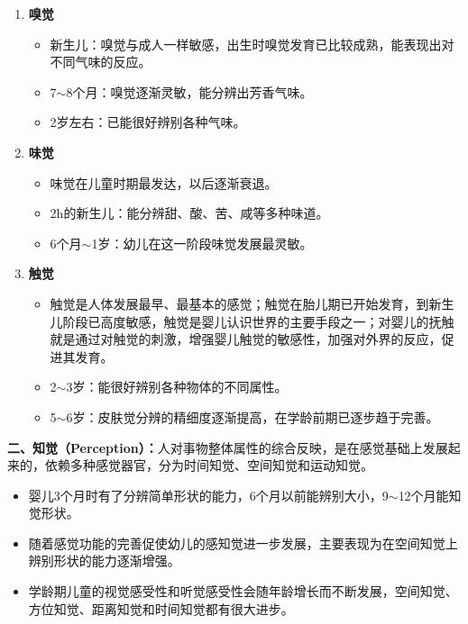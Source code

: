 \begin{keybox}
\begin{enumerate}[leftmargin=*]
    \item \textbf{嗅觉}
    \begin{itemize}[leftmargin=*]
        \item 新生儿：嗅觉与成人一样敏感，出生时嗅觉发育已比较成熟，能表现出对不同气味的反应。
        \item 7$\sim$8个月：嗅觉逐渐灵敏，能分辨出芳香气味。
        \item 2岁左右：已能很好辨别各种气味。
    \end{itemize}

    \item \textbf{味觉}
    \begin{itemize}[leftmargin=*]
        \item 味觉在儿童时期最发达，以后逐渐衰退。
        \item 2h的新生儿：能分辨甜、酸、苦、咸等多种味道。
        \item 6个月$\sim$1岁：幼儿在这一阶段味觉发展最灵敏。
    \end{itemize}

    \item \textbf{触觉}
    \begin{itemize}[leftmargin=*]
        \item 触觉是人体发展最早、最基本的感觉；触觉在胎儿期已开始发育，到新生儿阶段已高度敏感，触觉是婴儿认识世界的主要手段之一；对婴儿的抚触就是通过对触觉的刺激，增强婴儿触觉的敏感性，加强对外界的反应，促进其发育。
        \item 2$\sim$3岁：能很好辨别各种物体的不同属性。
        \item 5$\sim$6岁：皮肤觉分辨的精细度逐渐提高，在学龄前期已逐步趋于完善。
    \end{itemize}
\end{enumerate}

\textbf{二、知觉（Perception）：}人对事物整体属性的综合反映，是在感觉基础上发展起来的，依赖多种感觉器官，分为时间知觉、空间知觉和运动知觉。

\begin{itemize}[leftmargin=*]
    \item 婴儿3个月时有了分辨简单形状的能力，6个月以前能辨别大小，9$\sim$12个月能知觉形状。
    \item 随着感觉功能的完善促使幼儿的感知觉进一步发展，主要表现为在空间知觉上辨别形状的能力逐渐增强。
    \item 学龄期儿童的视觉感受性和听觉感受性会随年龄增长而不断发展，空间知觉、方位知觉、距离知觉和时间知觉都有很大进步。
\end{itemize}
\end{keybox}

